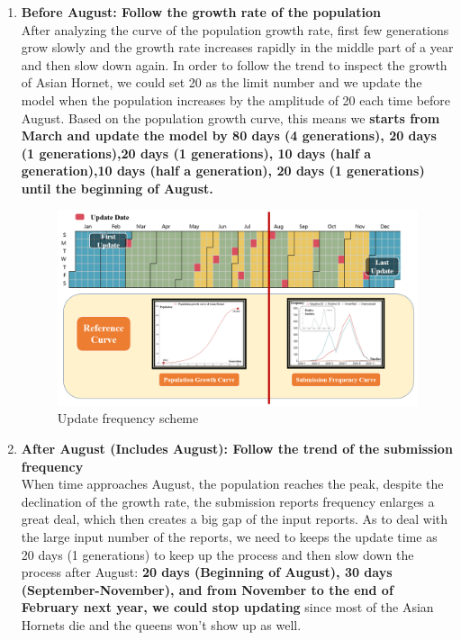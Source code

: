\documentclass{mcmthesis}
\begin{document}
 	\begin{enumerate}
 		\item \textbf{Before August: Follow the growth rate of the population}\\
 		After analyzing the curve of the population growth rate, first few generations grow slowly and the growth rate increases rapidly in the middle part of a year and then slow down again. In order to follow the trend to inspect the growth of Asian Hornet, we could set 20 as the limit number and we update the model when the population increases by the amplitude of 20 each time before August. Based on the population growth curve, this means we \textbf{starts from March and update the model by 80 days (4 generations), 20 days (1 generations),20 days (1 generations), 10 days (half a generation),10 days (half a generation), 20 days (1 generations)  until the beginning of August.}
			\begin{figure}[h]
 		\centering
 		\includegraphics[scale=0.56]{scheme.png}
 		\caption{Update frequency scheme}
 		\label{scheme}
 	\end{figure}
 		\item \textbf{After August (Includes August): Follow the trend of the submission frequency}\\		
 		When time approaches August, the population reaches the peak, despite the declination of the growth rate, the submission reports frequency enlarges a great deal, which then creates a big gap of the input reports. As to deal with the large input number of the reports, we need to keeps the update time as 20 days (1 generations) to keep up the process and then slow down the process after August: \textbf{20 days (Beginning of August), 30 days (September-November), and from November to the end of February next year, we could stop updating} since most of the Asian Hornets die and the queens won't show up as well. 
 	\end{enumerate}
\end{document}

